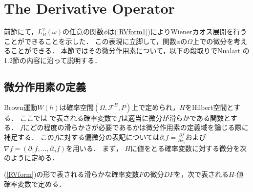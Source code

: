 \section{The Derivative Operator}
前節にて，$L^2_B(\omega)$の任意の関数$\phi$は(\ref{RVform1})によりWienerカオス展開を行うことができることを示した．
この表現に立脚して，関数$\phi$の$\Omega$上での微分を考えることができる．
本節ではその微分作用素について，以下の段取りでNualart\cite{Nualart2006} の1.2節の内容に沿って説明する．

\subsection{微分作用素の定義}
Brown運動$W(h)$は確率空間$(\Omega,\mathcal{F}^B,P)$上で定められ，$H$をHilbert空間とする．
ここでは
で表される確率変数で$f$は適当に微分が滑らかである関数とする．
$f$にどの程度の滑らかさが必要であるかは微分作用素の定義域を論じる際に補足する．
この$f$に対する偏微分の表記については$\partial_if=\frac{\partial f}{\partial x_i}$および$\nabla f=(\partial_1f,...,\partial_nf)$を用いる．
まず，
$H$に値をとる確率変数に対する微分を次のように定める．
\begin{definition}\label{def1.2.1}%
(\ref{RVform})の形で表される滑らかな確率変数$F$の微分$DF$を，次で表される$H$-値確率変数で定める．
\end{definition}

